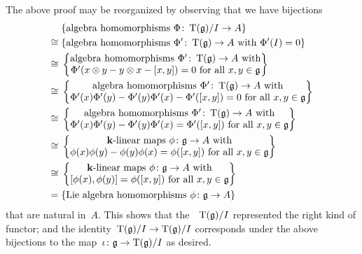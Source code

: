 \begin{remark}
  The above proof may be reorganized by observing that we have bijections
  \begin{align*}
    {}&
    \{ \text{algebra homomorphisms~$\Phi \colon \Tensor(\glie)/I \to A$} \}
    \\
    \cong{}&
    \{ \text{algebra homomorphisms~$\Phi' \colon \Tensor(\glie) \to A$ with~$\Phi'(I) = 0$} \}
    \\
    \cong{}&
    \left\{
      \begin{tabular}{@{}c@{}}
        algebra homomorphisms~$\Phi' \colon \Tensor(\glie) \to A$ with  \\
        $\Phi'(x \tensor y - y \tensor x - [x,y]) = 0$ for all~$x, y \in \glie$
      \end{tabular}
    \right\}
    \\
    \cong{}&
    \left\{
      \begin{tabular}{@{}c@{}}
        algebra homomorphisms~$\Phi' \colon \Tensor(\glie) \to A$ with  \\
        $\Phi'(x) \Phi'(y) - \Phi'(y) \Phi'(x) - \Phi'([x,y]) = 0$ for all~$x, y \in \glie$
      \end{tabular}
    \right\}
    \\
    \cong{}&
    \left\{
      \begin{tabular}{@{}c@{}}
        algebra homomorphisms~$\Phi' \colon \Tensor(\glie) \to A$ with  \\
        $\Phi'(x) \Phi'(y) - \Phi'(y) \Phi'(x) = \Phi'([x,y])$ for all~$x, y \in \glie$
      \end{tabular}
    \right\}
    \\
    \cong{}&
    \left\{
      \begin{tabular}{@{}c@{}}
        {\linear{$\kf$}} maps~$\phi \colon \glie \to A$ with  \\
        $\phi(x) \phi(y) - \phi(y) \phi(x) = \phi([x,y])$ for all~$x, y \in \glie$
      \end{tabular}
    \right\}
    \\
    \cong{}&
    \left\{
      \begin{tabular}{@{}c@{}}
        {\linear{$\kf$}} maps~$\phi \colon \glie \to A$ with  \\
        $[\phi(x), \phi(y)] = \phi([x,y])$ for all~$x, y \in \glie$ 
      \end{tabular}
    \right\}
    \\
    ={}&
    \{ \text{Lie~algebra homomorphisms~$\phi \colon \glie \to A$} \}
  \end{align*}
  that are natural in~$A$.
  This shows that the~{\algebra{$\kf$}}~$\operatorname{T}(\mathfrak{g})/I$ represented the right kind of functor;
  and the identity~$\operatorname{T}(\mathfrak{g})/I \to \operatorname{T}(\mathfrak{g})/I$ corresponds under the above bijections to the map~$\iota \colon \mathfrak{g} \to \operatorname{T}(\mathfrak{g})/I$ as desired.
\end{remark}





